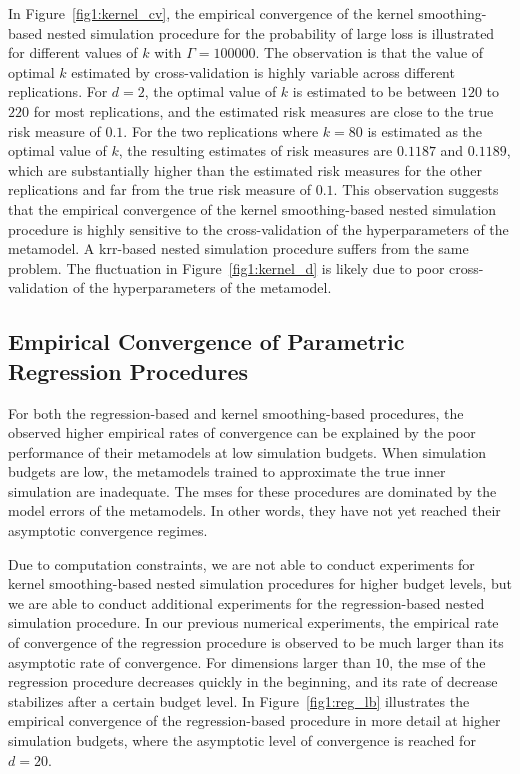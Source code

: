 In Figure~\ref{fig1:kernel_cv}, the empirical convergence of the kernel smoothing-based nested simulation procedure for the probability of large loss is illustrated for different values of $k$ with $\Gamma = \num{100000}$.
The observation is that the value of optimal $k$ estimated by cross-validation is highly variable across different replications.
For $d = 2$, the optimal value of $k$ is estimated to be between $120$ to $220$ for most replications, and the estimated risk measures are close to the true risk measure of $0.1$.
For the two replications where $k = 80$ is estimated as the optimal value of $k$, the resulting estimates of risk measures are $0.1187$ and $0.1189$, which are substantially higher than the estimated risk measures for the other replications and far from the true risk measure of $0.1$.
This observation suggests that the empirical convergence of the kernel smoothing-based nested simulation procedure is highly sensitive to the cross-validation of the hyperparameters of the metamodel.
A \gls{krr}-based nested simulation procedure suffers from the same problem. 
The fluctuation in Figure~\ref{fig1:kernel_d} is likely due to poor cross-validation of the hyperparameters of the metamodel.

\subsection{Empirical Convergence of Parametric Regression Procedures}\label{sec1:regression-convergence}

For both the regression-based and kernel smoothing-based procedures, the observed higher empirical rates of convergence can be explained by the poor performance of their metamodels at low simulation budgets. 
When simulation budgets are low, the metamodels trained to approximate the true inner simulation are inadequate.
The \gls{mse}s for these procedures are dominated by the model errors of the metamodels.
In other words, they have not yet reached their asymptotic convergence regimes.

Due to computation constraints, we are not able to conduct experiments for kernel smoothing-based nested simulation procedures for higher budget levels, but we are able to conduct additional experiments for the regression-based nested simulation procedure.
In our previous numerical experiments, the empirical rate of convergence of the regression procedure is observed to be much larger than its asymptotic rate of convergence.
For dimensions larger than $10$, the \gls{mse} of the regression procedure decreases quickly in the beginning, and its rate of decrease stabilizes after a certain budget level.
In Figure~\ref{fig1:reg_lb} illustrates the empirical convergence of the regression-based procedure in more detail at higher simulation budgets, where the asymptotic level of convergence is reached for $d = 20$.

